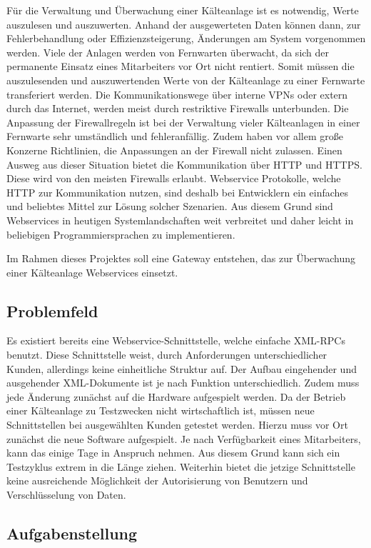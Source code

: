 \documentclass{article}
\begin{document}
Für die Verwaltung und Überwachung einer Kälteanlage ist es notwendig, Werte auszulesen und auszuwerten. Anhand der ausgewerteten Daten können dann, zur Fehlerbehandlung oder Effizienzsteigerung, Änderungen am System vorgenommen werden. Viele der Anlagen werden von Fernwarten überwacht, da sich der permanente Einsatz eines Mitarbeiters vor Ort nicht rentiert. Somit müssen die auszulesenden und auszuwertenden Werte von der Kälteanlage zu einer Fernwarte transferiert werden. Die Kommunikationswege über interne VPNs oder extern durch das Internet, werden meist durch restriktive Firewalls unterbunden. Die Anpassung der Firewallregeln ist bei der Verwaltung vieler Kälteanlagen in einer Fernwarte sehr umständlich und fehleranfällig. Zudem haben vor allem große Konzerne Richtlinien, die Anpassungen an der Firewall nicht zulassen. Einen Ausweg aus dieser Situation bietet die Kommunikation über HTTP und HTTPS. Diese wird von den meisten Firewalls erlaubt. Webservice Protokolle, welche HTTP zur Kommunikation nutzen, sind deshalb bei Entwicklern ein einfaches und beliebtes Mittel zur Lösung solcher Szenarien. Aus diesem Grund sind Webservices in heutigen Systemlandschaften weit verbreitet und daher leicht in beliebigen Programmiersprachen zu implementieren.

Im Rahmen dieses Projektes soll eine Gateway entstehen, das zur Überwachung einer Kälteanlage Webservices einsetzt.

\subsection{Problemfeld}

Es existiert bereits eine Webservice-Schnittstelle, welche einfache XML-RPCs benutzt. Diese Schnittstelle weist, durch Anforderungen unterschiedlicher Kunden, allerdings keine einheitliche Struktur auf. Der Aufbau eingehender und ausgehender XML-Dokumente ist je nach Funktion unterschiedlich. Zudem muss jede Änderung zunächst auf die Hardware aufgespielt werden. Da der Betrieb einer Kälteanlage zu Testzwecken nicht wirtschaftlich ist, müssen neue Schnittstellen bei ausgewählten Kunden getestet werden. Hierzu muss vor Ort zunächst die neue Software aufgespielt. Je nach Verfügbarkeit eines Mitarbeiters, kann das einige Tage in Anspruch nehmen. Aus diesem Grund kann sich ein Testzyklus extrem in die Länge ziehen. Weiterhin bietet die jetzige Schnittstelle keine ausreichende Möglichkeit der Autorisierung von Benutzern und Verschlüsselung von Daten.

\subsection{Aufgabenstellung}
\end{document}
